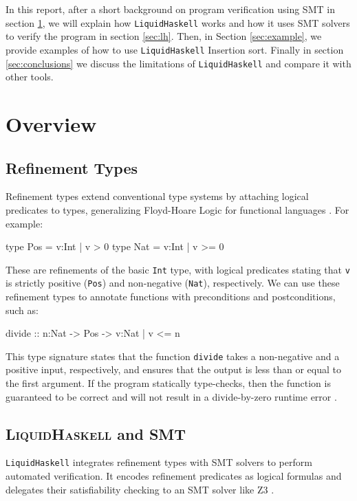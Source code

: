 \documentclass[]{rptuseminar}
\begin{document}
In this report, after a short background on program verification using SMT in section \ref{sec:background}, we will explain 
how \texttt{LiquidHaskell} works and how it uses SMT solvers to 
verify the program in section \ref{sec:lh}. Then, in Section \ref{sec:example}, we provide examples of how to use 
\texttt{LiquidHaskell} Insertion sort. Finally in section \ref{sec:conclusions} we 
discuss the limitations of \texttt{LiquidHaskell} and compare it with other tools.


\section{Overview}
\label{sec:background}

\subsection{Refinement Types}  
Refinement types extend conventional type systems by attaching logical predicates to types, 
generalizing Floyd-Hoare Logic for functional languages \cite{vazou_refinement_2014}. For example:  

\begin{haskell}  
type Pos = {v:Int | v > 0}  
type Nat = {v:Int | v >= 0}  
\end{haskell}  

These are refinements of the basic \texttt{Int} type, with logical predicates stating that 
\texttt{v} is strictly positive (\texttt{Pos}) and non-negative (\texttt{Nat}), respectively. 
We can use these refinement types to annotate functions with preconditions and postconditions, such as:  

\begin{haskell}  
divide :: n:Nat -> Pos -> {v:Nat | v <= n}  
\end{haskell}  

This type signature states that the function \texttt{divide} takes a non-negative and a positive input, respectively, 
and ensures that the output is less than or equal to the first argument. 
If the program statically type-checks, then the function is guaranteed to be correct 
and will not result in a divide-by-zero runtime error \cite{vazou_refinement_2014}.  

\subsection{\textsc{LiquidHaskell} and SMT}
\texttt{LiquidHaskell} integrates refinement types with SMT solvers to perform automated verification. 
It encodes refinement predicates as logical formulas and delegates their satisfiability checking to an SMT solver like Z3 
\cite{vazou_refinement_2014}. 
\end{document}
